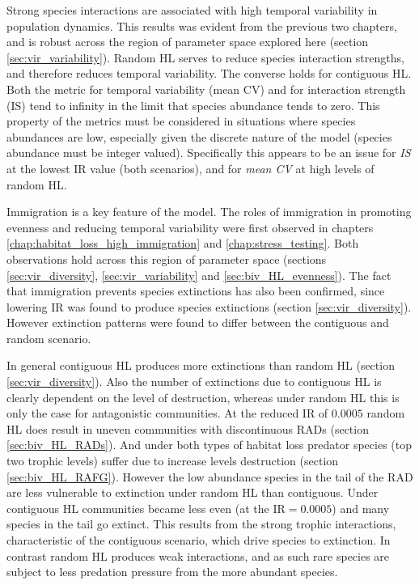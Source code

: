 Strong species interactions are associated with high temporal variability in population dynamics. This results was evident from the previous two chapters, and is robust across the region of parameter space explored here (section \ref{sec:vir_variability}). Random HL serves to reduce species interaction strengths, and therefore reduces temporal variability. The converse holds for contiguous HL. Both the metric for temporal variability (mean CV) and for interaction strength (IS) tend to infinity in the limit that species abundance tends to zero. This property of the metrics must be considered in situations where species abundances are low, especially given the discrete nature of the model (species abundance must be integer valued). Specifically this appears to be an issue for \emph{IS} at the lowest IR value (both scenarios), and for \emph{mean CV} at high levels of random HL.

Immigration is a key feature of the model. The roles of immigration in promoting evenness and reducing temporal variability were first observed in chapters \ref{chap:habitat_loss_high_immigration} and \ref{chap:stress_testing}. Both observations hold across this region of parameter space (sections \ref{sec:vir_diversity}, \ref{sec:vir_variability} and \ref{sec:biv_HL_evenness}). The fact that immigration prevents species extinctions has also been confirmed, since lowering IR was found to produce species extinctions (section \ref{sec:vir_diversity}). However extinction patterns were found to differ between the contiguous and random scenario. 

In general contiguous HL produces more extinctions than random HL (section \ref{sec:vir_diversity}). Also the number of extinctions due to contiguous HL is clearly dependent on the level of destruction, whereas under random HL this is only the case for antagonistic communities. At the reduced IR of $0.0005$ random HL does result in uneven communities with discontinuous RADs (section \ref{sec:biv_HL_RADs}). And under both types of habitat loss predator species (top two trophic levels) suffer due to increase levels destruction (section \ref{sec:biv_HL_RAFG}). However the low abundance species in the tail of the RAD are less vulnerable to extinction under random HL than contiguous. Under contiguous HL communities became less even (at the IR$=0.0005$) and many species in the tail go extinct. This results from the strong trophic interactions, characteristic of the contiguous scenario, which drive species to extinction. In contrast random HL produces weak interactions, and as such rare species are subject to less predation pressure from the more abundant species. 

